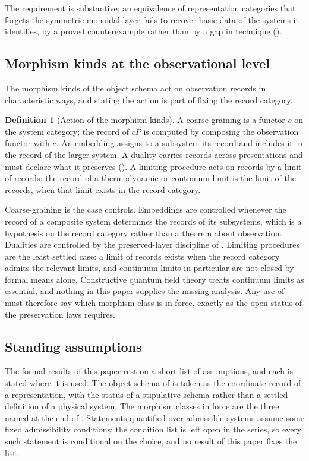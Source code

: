 \documentclass[11pt,letterpaper]{article}
\theoremstyle{definition}
\newtheorem{definition}[theorem]{Definition}
\theoremstyle{remark}
\begin{document}
The requirement is substantive: an equivalence of representation categories that forgets the symmetric monoidal layer fails to recover basic data of the systems it identifies, by a proved counterexample rather than by a gap in technique ().

\subsection{Morphism kinds at the observational level}
\label{sec:morphisms}

The morphism kinds of the object schema act on observation records in characteristic ways, and stating the action is part of fixing the record category.

\begin{definition}[Action of the morphism kinds]
\label{def:morphisms}
A coarse-graining is a functor $c$ on the system category; the record of $cP$ is computed by composing the observation functor with $c$. An embedding assigns to a subsystem its record and includes it in the record of the larger system. A duality carries records across presentations and must declare what it preserves (). A limiting procedure acts on records by a limit of records: the record of a thermodynamic or continuum limit is the limit of the records, when that limit exists in the record category.
\end{definition}

Coarse-graining is the case  controls. Embeddings are controlled whenever the record of a composite system determines the records of its subsystems, which is a hypothesis on the record category rather than a theorem about observation. Dualities are controlled by the preserved-layer discipline of . Limiting procedures are the least settled case: a limit of records exists when the record category admits the relevant limits, and continuum limits in particular are not closed by formal means alone. Constructive quantum field theory treats continuum limits as essential, and nothing in this paper supplies the missing analysis. Any use of  must therefore say which morphism class is in force, exactly as the open status of the preservation laws requires.

\subsection{Standing assumptions}

The formal results of this paper rest on a short list of assumptions, and each is stated where it is used. The object schema of  is taken as the coordinate record of a representation, with the status of a stipulative schema rather than a settled definition of a physical system. The morphism classes in force are the three named at the end of . Statements quantified over admissible systems assume some fixed admissibility conditions; the condition list is left open in the series, so every such statement is conditional on the choice, and no result of this paper fixes the list.
\end{document}
